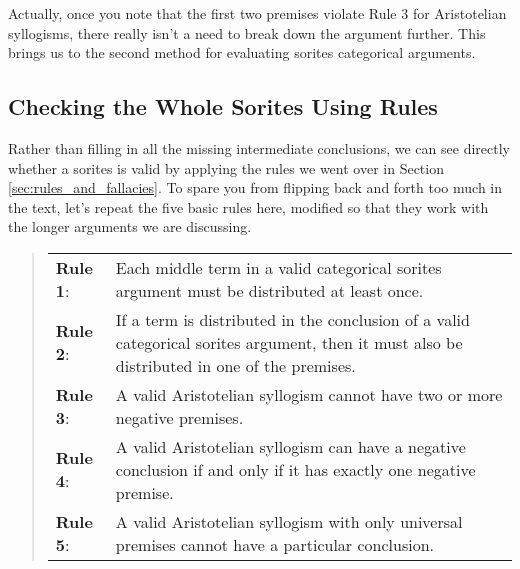 \begin{center}
\end{center}

Actually, once you note that the first two premises violate Rule 3 for Aristotelian syllogisms, there really isn't a need to break down the argument further. This brings us to the second method for evaluating sorites categorical arguments.

\subsection{Checking the Whole Sorites Using Rules}

Rather than filling in all the missing intermediate conclusions, we can see directly whether a sorites is valid by applying the rules we went over in Section  \ref{sec:rules_and_fallacies}. To spare you from flipping back and forth too much in the text, let's repeat the five basic rules here, modified so that they work with the longer arguments we are discussing.

\begin{quotation}
\begin{tabu}{p{.1\linewidth}p{.9\linewidth}}
\textbf{Rule 1}: & Each middle term in a valid categorical sorites argument must be distributed at least once. \\
\textbf{Rule 2}: & If a term is distributed in the conclusion of a valid categorical sorites argument, then it must also be distributed in one of the premises. \\
\textbf{Rule 3}: & A valid Aristotelian syllogism cannot have two or more negative premises. \\
\textbf{Rule 4}: & A valid Aristotelian syllogism can have a negative conclusion if and only if it has exactly one negative premise.\\
\textbf{Rule 5}: & A valid Aristotelian syllogism with only universal premises cannot have a particular conclusion.
\end{tabu}
\end{quotation}

